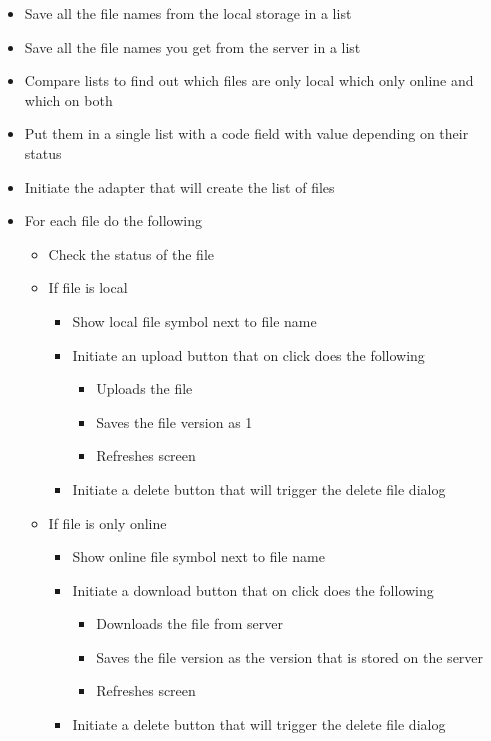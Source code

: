 \documentclass[11pt]{article}
\begin{document}
\begin{itemize}
	\item{Save all the file names from the local storage in a list}
	\item{Save all the file names you get from the server in a list}
	\item{Compare lists to find out which files are only local which only online and which on both}
	\item{Put them in a single list with a code field with value depending on their status}
	\item{Initiate the adapter that will create the list of files}
	\item{
	For each file do the following
	\begin{itemize}
		\item{Check the status of the file}
		\item{
		If file is local
		\begin{itemize}
			\item{Show local file symbol next to file name}
			\item{
			Initiate an upload button that on click does the following
			\begin{itemize}
				\item{Uploads the file}
				\item{Saves the file version as 1}
				\item{Refreshes screen}
			\end{itemize}
			}
			\item{
			Initiate a delete button that will trigger the delete file dialog
			}
		\end{itemize}
		}
		\item{
		If file is only online
		\begin{itemize}
			\item{Show online file symbol next to file name}
			\item{
			Initiate a download button that on click does the following
			\begin{itemize}
				\item{Downloads the file from server}
				\item{Saves the file version as the version that is stored on the server}
				\item{Refreshes screen}
			\end{itemize}
			}
			\item{
			Initiate a delete button that will trigger the delete file dialog
			}
		\end{itemize}
}
\end{itemize}}
\end{itemize}
\end{document}
